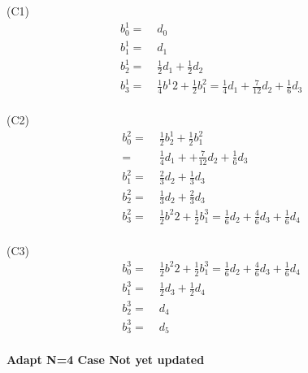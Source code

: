 \documentclass[12pt]{article}
\begin{document}
(C1)
\begin{align*}
b^{1}_{0} =&\; d_0 \\
b^{1}_{1} =&\; d_1 \\
b^{1}_{2} =&\; \frac{1}{2} d_1 + \frac{1}{2}d_2 \\
b^{1}_{3} =&\; \frac{1}{4} b^{1}{2} + \frac{1}{2} b^{2}_{1} =\frac{1}{4}d_1 +\frac{7}{12}d_2 + \frac{1}{6}d_3 \\
\end{align*}

(C2)
\begin{align*}
b^{2}_{0} =&\; \frac{1}{2} b^{1}_{2} + \frac{1}{2} b^{2}_{1}\\
=&\; \frac{1}{4} d_1 + +\frac{7}{12}d_2 + \frac{1}{6}d_3 \\
b^{2}_{1} =&\; \frac{2}{3} d_2 + \frac{1}{3}d_3 \\
b^{2}_{2} =&\; \frac{1}{3} d_2 + \frac{2}{3}d_3 \\
b^{2}_{3} =&\; \frac{1}{2} b^{2}{2} + \frac{1}{2} b^{3}_{1} =\frac{1}{6}d_2 +\frac{4}{6}d_3 + \frac{1}{6}d_4 \\
\end{align*}

(C3)
\begin{align*}
b^{3}_{0} =&\; \frac{1}{2} b^{2}{2} + \frac{1}{2} b^{3}_{1} =\frac{1}{6}d_2 +\frac{4}{6}d_3 + \frac{1}{6}d_4 \\
b^{3}_{1} =&\; \frac{1}{2}d_3 + \frac{1}{2} d_4 \\
b^{3}_{2} =&\; d_4 \\
b^{3}_{3} =&\; d_5 \\
\end{align*}





\vspace {.25 cm}\noindent
{\bf Adapt N=4 Case Not yet updated} \\
\end{document}
